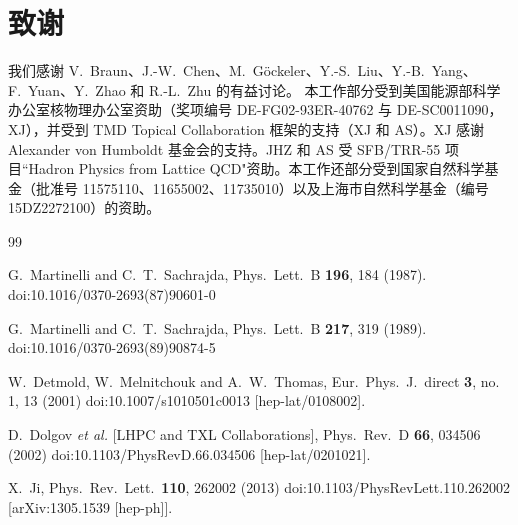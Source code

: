 \section*{致谢}
我们感谢 V.\ Braun、J.-W.\ Chen、M.\ G\"ockeler、Y.-S.\ Liu、Y.-B.\ Yang、F.\ Yuan、Y.\ Zhao 和 R.-L.\ Zhu 的有益讨论。
本工作部分受到美国能源部科学办公室核物理办公室资助（奖项编号 DE-FG02-93ER-40762 与 DE-SC0011090，XJ），并受到 TMD Topical Collaboration 框架的支持（XJ 和 AS）。XJ 感谢 Alexander von Humboldt 基金会的支持。JHZ 和 AS 受 SFB/TRR-55 项目``Hadron Physics from Lattice QCD"资助。本工作还部分受到国家自然科学基金（批准号 11575110、11655002、11735010）以及上海市自然科学基金（编号 15DZ2272100）的资助。

\begin{thebibliography}{99}

  G.~Martinelli and C.~T.~Sachrajda,
  Phys.\ Lett.\ B {\bf 196}, 184 (1987).
  doi:10.1016/0370-2693(87)90601-0


  G.~Martinelli and C.~T.~Sachrajda,
  Phys.\ Lett.\ B {\bf 217}, 319 (1989).
  doi:10.1016/0370-2693(89)90874-5


  W.~Detmold, W.~Melnitchouk and A.~W.~Thomas,
  Eur.\ Phys.\ J.\ direct {\bf 3}, no. 1, 13 (2001)
  doi:10.1007/s1010501c0013
  [hep-lat/0108002].


  D.~Dolgov {\it et al.} [LHPC and TXL Collaborations],
  Phys.\ Rev.\ D {\bf 66}, 034506 (2002)
  doi:10.1103/PhysRevD.66.034506
  [hep-lat/0201021].


  X.~Ji,
  Phys.\ Rev.\ Lett.\  {\bf 110}, 262002 (2013)
  doi:10.1103/PhysRevLett.110.262002
  [arXiv:1305.1539 [hep-ph]].



\end{thebibliography}
